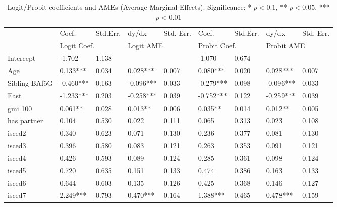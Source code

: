 \begin{table}
\footnotesize
\caption{Logit/Probit coefficients and AMEs (Average Marginal Effects). Significance: * \( p < 0.1 \), ** \( p < 0.05 \), *** \( p < 0.01 \)}
\label{tab:logit-probit-ame}
\begin{tabular}{lllllllll}
\toprule
                        & Coef.    & Std.Err.  & dy/dx      & Std. Err.  & Coef.     & Std.Err.   & dy/dx      & Std. Err. \\
                        & \multicolumn{2}{l}{Logit Coef.} & \multicolumn{2}{l}{Logit AME} & \multicolumn{2}{l}{Probit Coef.} & \multicolumn{2}{l}{Probit AME} \\
\midrule
Intercept               & -1.702    & 1.138     &            &            & -1.070    & 0.674      &            &           \\
Age                     & 0.133***  & 0.034     & 0.028***   & 0.007      & 0.080***  & 0.020      & 0.028***   & 0.007     \\
Sibling BAföG           & -0.460*** & 0.163     & -0.096***  & 0.033      & -0.279*** & 0.098      & -0.096***  & 0.033     \\
East                    & -1.233*** & 0.203     & -0.258***  & 0.039      & -0.752*** & 0.122      & -0.259***  & 0.039     \\
gmi 100                 & 0.061**   & 0.028     & 0.013**    & 0.006      & 0.035**   & 0.014      & 0.012**    & 0.005     \\
has partner             & 0.104     & 0.530     & 0.022      & 0.111      & 0.065     & 0.313      & 0.023      & 0.108     \\
isced2                  & 0.340     & 0.623     & 0.071      & 0.130      & 0.236     & 0.377      & 0.081      & 0.130     \\
isced3                  & 0.396     & 0.580     & 0.083      & 0.121      & 0.263     & 0.353      & 0.091      & 0.121     \\
isced4                  & 0.426     & 0.593     & 0.089      & 0.124      & 0.285     & 0.361      & 0.098      & 0.124     \\
isced5                  & 0.720     & 0.635     & 0.151      & 0.133      & 0.474     & 0.386      & 0.163      & 0.133     \\
isced6                  & 0.644     & 0.603     & 0.135      & 0.126      & 0.425     & 0.368      & 0.146      & 0.127     \\
isced7                  & 2.249***  & 0.793     & 0.470***   & 0.164      & 1.388***  & 0.465      & 0.478***   & 0.159     \\

\end{tabular}
\end{table}
